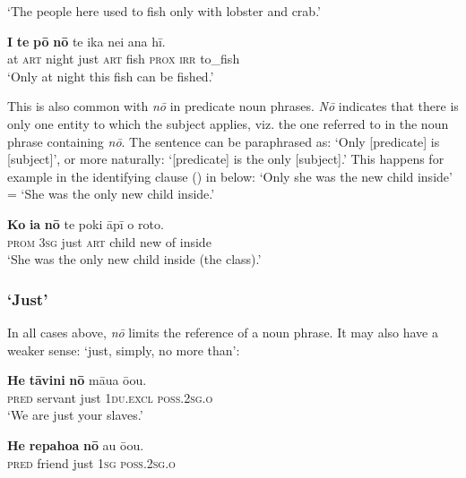 \glt 
‘The people here used to fish only with lobster and crab.’ \textstyleExampleref{[R354.029]} 
\z

\ea\label{ex:5.147}
\gll \textbf{{\ꞌ}I} \textbf{te} \textbf{pō} \textbf{nō} te ika nei ana hī. \\
at \textsc{art} night just \textsc{art} fish \textsc{prox} \textsc{irr} to\_fish \\

\glt
‘Only at night this fish can be fished.’ \textstyleExampleref{[R364.007]} 
\z

This is also common with \textit{nō} in predicate noun phrases. \textit{Nō} indicates that there is only one entity to which the subject applies, viz. the one referred to in the noun phrase containing \textit{nō}. The sentence can be paraphrased as: ‘Only [predicate] is [subject]’, or more naturally: ‘[predicate] is the only [subject].’ This happens for example in the identifying clause () in  below: ‘Only she was the new child inside’ = ‘She was the only new child inside.’ 

\ea\label{ex:5.148}
\gll \textbf{Ko} \textbf{ia} \textbf{nō} te poki {\ꞌ}āpī o roto. \\
\textsc{prom} \textsc{3sg} just \textsc{art} child new of inside \\

\glt 
‘She was the only new child inside (the class).’ \textstyleExampleref{[R151.020]} 
\z

\subsubsection{‘Just’}\label{sec:5.8.2.3}

In all cases above, \textit{nō} limits the reference of a noun phrase. It may also have a weaker sense: ‘just, simply, no more than’:

\ea\label{ex:5.149}
\gll \textbf{He} \textbf{tāvini} \textbf{nō} māua ō{\ꞌ}ou. \\
\textsc{pred} servant just \textsc{1du.excl} \textsc{poss.2sg.o} \\

\glt 
‘We are just your slaves.’ \textstyleExampleref{[R214.015]} 
\z

\ea\label{ex:5.150}
\gll \textbf{He} \textbf{repahoa} \textbf{nō} au ō{\ꞌ}ou. \\
\textsc{pred} friend just \textsc{1sg} \textsc{poss.2sg.o} \\


